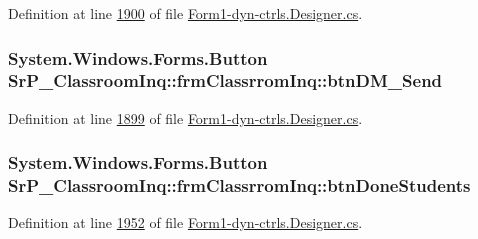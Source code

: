 \-Definition at line \hyperlink{_form1-dyn-ctrls_8_designer_8cs_source_l01900}{1900} of file \hyperlink{_form1-dyn-ctrls_8_designer_8cs_source}{\-Form1-\/dyn-\/ctrls.\-Designer.\-cs}.

\hypertarget{class_sr_p___classroom_inq_1_1frm_classrrom_inq_a5633d72d43c108b34eb912acdcc81878}{
\subsubsection[{btn\-D\-M\-\_\-\-Send}]{\setlength{\rightskip}{0pt plus 5cm}\-System.\-Windows.\-Forms.\-Button {\bf \-Sr\-P\-\_\-\-Classroom\-Inq\-::frm\-Classrrom\-Inq\-::btn\-D\-M\-\_\-\-Send}}}
\label{class_sr_p___classroom_inq_1_1frm_classrrom_inq_a5633d72d43c108b34eb912acdcc81878}


\-Definition at line \hyperlink{_form1-dyn-ctrls_8_designer_8cs_source_l01899}{1899} of file \hyperlink{_form1-dyn-ctrls_8_designer_8cs_source}{\-Form1-\/dyn-\/ctrls.\-Designer.\-cs}.

\hypertarget{class_sr_p___classroom_inq_1_1frm_classrrom_inq_a9225d189a561ae3a5b9f68ca3c004351}{
\subsubsection[{btn\-Done\-Students}]{\setlength{\rightskip}{0pt plus 5cm}\-System.\-Windows.\-Forms.\-Button {\bf \-Sr\-P\-\_\-\-Classroom\-Inq\-::frm\-Classrrom\-Inq\-::btn\-Done\-Students}}}
\label{class_sr_p___classroom_inq_1_1frm_classrrom_inq_a9225d189a561ae3a5b9f68ca3c004351}


\-Definition at line \hyperlink{_form1-dyn-ctrls_8_designer_8cs_source_l01952}{1952} of file \hyperlink{_form1-dyn-ctrls_8_designer_8cs_source}{\-Form1-\/dyn-\/ctrls.\-Designer.\-cs}.

